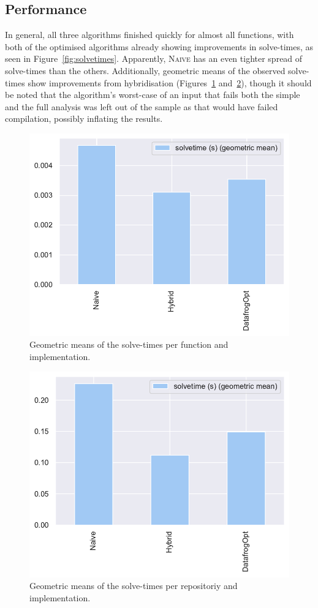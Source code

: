 \documentclass[11pt,a4paper,twoside,openany]{report}
\begin{document}
\subsection{Performance}\label{sec:inputs:performance}

In general, all three algorithms finished quickly for almost all functions, with
both of the optimised algorithms already showing improvements in
solve-times, as seen in Figure~\ref{fig:solvetimes}. Apparently, \textsc{Naive}
has an even tighter spread of solve-times than the others. Additionally,
geometric means of the observed solve-times show improvements from hybridisation
(Figures~\ref{fig:solvetimes-gmean-fn} and~\ref{fig:solvetimes-gmean-repo}),
though it should be noted that the algorithm's worst-case of an input that fails
both the simple and the full analysis was left out of the sample as that would
have failed compilation, possibly inflating the results.

\begin{figure}
  \includegraphics[width=0.5\linewidth]{Graphs/solvetimes_fn_gmean.pdf}
  \caption{Geometric means of the solve-times per function and implementation.}
  \label{fig:solvetimes-gmean-fn}
\end{figure}


\begin{figure}
  \includegraphics[width=0.5\linewidth]{Graphs/solvetimes_repo_gmean.pdf}
  \caption{Geometric means of the solve-times per repositoriy and
    implementation.}
  \label{fig:solvetimes-gmean-repo}
\end{figure}
\end{document}
